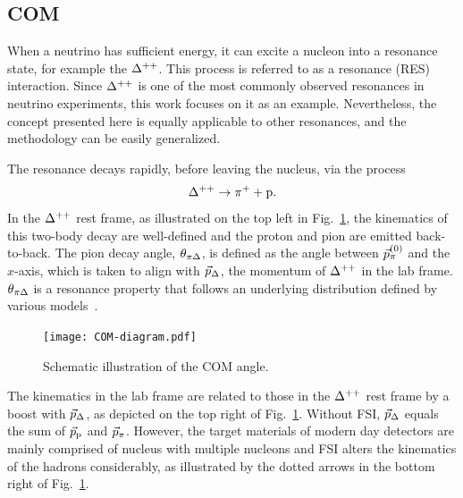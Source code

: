      \subsection{COM}
          \label{sec:com-intro}
          When a neutrino has sufficient energy, it can excite a nucleon into a resonance state, for example the $\Delta^{++}$. 
          This process is referred to as a resonance (RES) interaction.
          Since $\Delta^{++}$ is one of the most commonly observed resonances in neutrino experiments, this work focuses on it as an example.
          Nevertheless, the concept presented here is equally applicable to other resonances, and the methodology can be easily generalized.

          The resonance decays rapidly, before leaving the nucleus, via the process
          \begin{equation}
               \Delta^{++} \rightarrow \pi^+ + \textrm{p}.
          \end{equation}
          In the $\Delta^{++}$ rest frame, as illustrated on the top left in Fig.~\ref{fig:COM-diagram}, the kinematics of this two-body decay are well-defined and the proton and pion are emitted back-to-back.
          The pion decay angle, $\theta_{\pi\Delta}$, is defined as the angle between $\vec{p}_{\pi}^{(0)}$ and the $x$-axis, which is taken to align with $\vec{p}_{\Delta}$, the momentum of $\Delta^{++}$ in the lab frame. 
          $\theta_{\pi\Delta}$ is a resonance property that follows an underlying distribution defined by various models~\cite{Rein:1987cb,Kabirnezhad:2017jmf,Kabirnezhad:2020wtp,Kabirnezhad:2022znc}.

          \begin{figure}[ht!]
          \centering
          \texttt{[image: COM-diagram.pdf]}
          \caption{Schematic illustration of the COM angle.  }
          \label{fig:COM-diagram}
          \end{figure}

          The kinematics in the lab frame are related to those in the $\Delta^{++}$ rest frame by a boost with $\vec{p}_{\Delta}$, as depicted on the top right of Fig.~\ref{fig:COM-diagram}. 
          Without FSI, $\vec{p}_{\Delta}$ equals the sum of $\vec{p}_\textrm{p}$ and $\vec{p}_{\pi}$.
          However, the target materials of modern day detectors are mainly comprised of nucleus with multiple nucleons and FSI alters the kinematics of the hadrons considerably, as illustrated by the dotted arrows in the bottom right of Fig.~\ref{fig:COM-diagram}.

